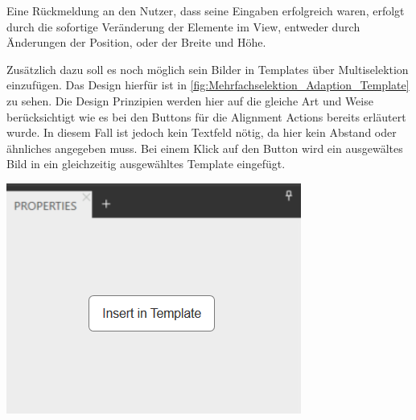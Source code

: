 Eine Rückmeldung an den Nutzer, dass seine Eingaben erfolgreich waren, erfolgt durch die sofortige Veränderung der Elemente im View, entweder durch Änderungen der Position, oder der Breite und Höhe.

Zusätzlich dazu soll es noch möglich sein Bilder in Templates über Multiselektion einzufügen.
Das Design hierfür ist in \cref{fig:Mehrfachselektion_Adaption_Template} zu sehen.
Die Design Prinzipien werden hier auf die gleiche Art und Weise berücksichtigt wie es bei den Buttons für die Alignment Actions bereits erläutert wurde.
In diesem Fall ist jedoch kein Textfeld nötig, da hier kein Abstand oder ähnliches angegeben muss.
Bei einem Klick auf den Button wird ein ausgewältes Bild in ein gleichzeitig ausgewähltes Template eingefügt.

\begin{center}
  \includegraphics[scale=0.8]{figures/Mehrfachselektion_Adaption03.png}
  \label{fig:Mehrfachselektion_Adaption_Template}
\end{center}




